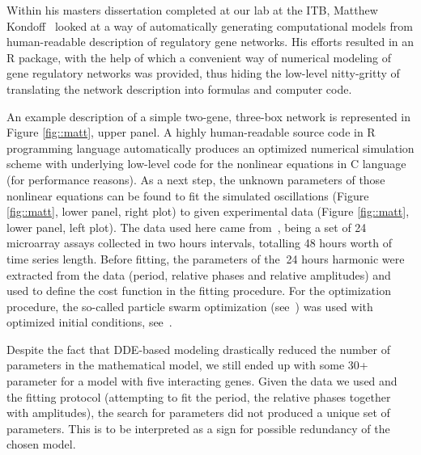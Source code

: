 Within his masters dissertation completed at our lab at the ITB,
Matthew Kondoff~\cite{kondoff2015modeling} looked at a way of
automatically generating computational models from human-readable
description of regulatory gene networks. His efforts resulted in an R
package, with the help of which a convenient way of numerical modeling
of gene regulatory networks was provided, thus hiding the low-level
nitty-gritty of translating the network description into formulas and
computer code.


An example description of a simple two-gene, three-box network is
represented in Figure \ref{fig::matt}, upper panel. A highly
human-readable source code in R programming language automatically
produces an optimized numerical simulation scheme with underlying
low-level code for the nonlinear equations in C language (for
performance reasons). As a next step, the unknown parameters of those
nonlinear equations can be found to fit the simulated oscillations
(Figure \ref{fig::matt}, lower panel, right plot) to given
experimental data (Figure \ref{fig::matt}, lower panel, left plot).
The data used here came from~\cite{zhang2014circadian}, being a set of
24 microarray assays collected in two hours intervals, totalling 48
hours worth of time series length. Before fitting, the parameters of
the $~$24 hours harmonic were extracted from the data (period,
relative phases and relative amplitudes) and used to define the cost
function in the fitting procedure. For the optimization procedure, the
so-called particle swarm optimization
(see~\cite{zambrano2012hydropso}) was used with optimized initial
conditions, see~\cite{richards2004choosing}.

Despite the fact that DDE-based modeling drastically reduced the
number of parameters in the mathematical model, we still ended up with
some 30+ parameter for a model with five interacting genes. Given the
data we used and the fitting protocol (attempting to fit the period,
the relative phases together with amplitudes), the search for
parameters did not produced a unique set of parameters. This is to be
interpreted as a sign for possible redundancy of the chosen model.
